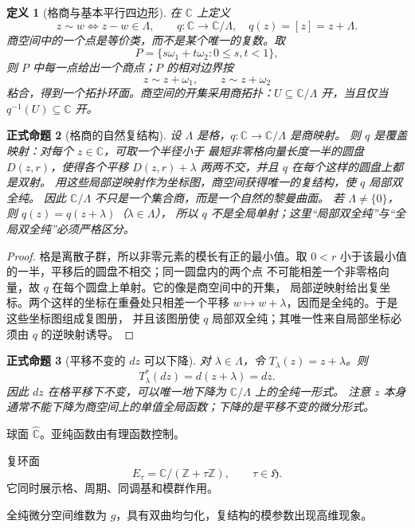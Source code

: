 \documentclass[UTF8,fontset=none,a4paper,11pt]{ctexart}
\theoremstyle{foundation-definition}
\newtheorem{definition}{定义}[section]
\theoremstyle{foundation-theorem}
\theoremstyle{foundation-proposition}
\newtheorem{proposition}[definition]{正式命题}
\theoremstyle{foundation-example}
\theoremstyle{foundation-remark}
\theoremstyle{foundation-theorem}
\newcommand{\C}{\mathbb C}
\newcommand{\Z}{\mathbb Z}
\begin{document}
\begin{definition}[格商与基本平行四边形]\label{def:lattice-quotient-parallelogram}
在 \(\mathbb C\) 上定义
\[
z\sim w\Longleftrightarrow z-w\in\Lambda,
\qquad
q:\mathbb C\to\mathbb C/\Lambda,\quad q(z)=[z]=z+\Lambda.
\]
商空间中的一个点是等价类，而不是某个唯一的复数。取
\[
P=\{s\omega_1+t\omega_2:0\leq s,t<1\},
\]
则 \(P\) 中每一点给出一个商点；\(P\) 的相对边界按
\[
z\sim z+\omega_1,\qquad z\sim z+\omega_2
\]
粘合，得到一个拓扑环面。商空间的开集采用商拓扑：\(U\subseteq\mathbb C/\Lambda\)
开，当且仅当 \(q^{-1}(U)\subseteq\mathbb C\) 开。
\end{definition}

\begin{proposition}[格商的自然复结构]
设 \(\Lambda\) 是格，\(q:\mathbb C\to\mathbb C/\Lambda\) 是商映射。
则 \(q\) 是覆盖映射：对每个 \(z\in\mathbb C\)，可取一个半径小于
最短非零格向量长度一半的圆盘 \(D(z,r)\)，使得各个平移
\(D(z,r)+\lambda\) 两两不交，并且 \(q\) 在每个这样的圆盘上都是双射。
用这些局部逆映射作为坐标图，商空间获得唯一的复结构，使 \(q\) 局部双全纯。
因此 \(\mathbb C/\Lambda\) 不只是一个集合商，而是一个自然的黎曼曲面。
若 \(\Lambda\ne\{0\}\)，则 \(q(z)=q(z+\lambda)\)（\(\lambda\in\Lambda\)），
所以 \(q\) 不是全局单射；这里“局部双全纯”与“全局双全纯”必须严格区分。
\end{proposition}

\begin{proof}
格是离散子群，所以非零元素的模长有正的最小值。取
\(0<r\) 小于该最小值的一半，平移后的圆盘不相交；同一圆盘内的两个点
不可能相差一个非零格向量，故 \(q\) 在每个圆盘上单射。它的像是商空间中的开集，
局部逆映射给出复坐标。两个这样的坐标在重叠处只相差一个平移
\(w\mapsto w+\lambda\)，因而是全纯的。于是这些坐标图组成复图册，
并且该图册使 \(q\) 局部双全纯；其唯一性来自局部坐标必须由 \(q\) 的逆映射诱导。
\end{proof}

\begin{proposition}[平移不变的 \(dz\) 可以下降]
对 \(\lambda\in\Lambda\)，令 \(T_\lambda(z)=z+\lambda\)。则
\[
T_\lambda^*(dz)=d(z+\lambda)=dz.
\]
因此 \(dz\) 在格平移下不变，可以唯一地下降为 \(\mathbb C/\Lambda\) 上的全纯一形式。
注意 \(z\) 本身通常不能下降为商空间上的单值全局函数；下降的是平移不变的微分形式。
\end{proposition}

\begin{description}[style=nextline,leftmargin=2.8cm]
  \item[亏格 \(0\)]
  球面 \(\widehat{\C}\)。亚纯函数由有理函数控制。
  \item[亏格 \(1\)]
  复环面
  \[
  E_\tau=\C/(\Z+\tau\Z),\qquad \tau\in\mathfrak H.
  \]
  它同时展示格、周期、同调基和模群作用。
  \item[亏格 \(g\geq2\)]
  全纯微分空间维数为 \(g\)，具有双曲均匀化，复结构的模参数出现高维现象。
\end{description}
\end{document}
